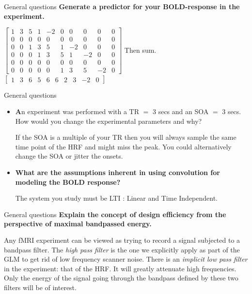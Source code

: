 \documentclass{beamer}
\begin{document}
\begin{frame}{General questions}
\textbf{Generate a predictor for your BOLD-response in the experiment.}

  \begin{center}
  $
  \left[ 
  \begin{array}{cccccccccc}
  1 & 3 & 5 & 1 & -2 & 0 & 0  & 0  & 0  & 0\\
  0 & 0 & 0 & 0 & 0  & 0 & 0  & 0  & 0  & 0\\
  0 & 0 & 1 & 3 & 5  & 1 & -2 & 0  & 0  & 0\\
  0 & 0 & 0 & 1 & 3  & 5 & 1  & -2 & 0  & 0\\
  0 & 0 & 0 & 0 & 0  & 0 & 0  & 0  & 0  & 0\\
  0 & 0 & 0 & 0 & 0  & 1 & 3  & 5  & -2 & 0
  \end{array}
  \right]
  $
\vfill
  Then sum.
\vfill  
  $
  \left[ 
  \begin{array}{cccccccccc}
  1 & 3 & 6 & 5 & 6  & 6 & 2  & 3  & -2 & 0
  \end{array}
  \right]
  $
  \end{center}
\end{frame}


\begin{frame}{General questions}
  \begin{itemize}
   \item \textbf An experiment was performed with a TR $=$ 3 secs and an SOA $=$ 3 secs. {How would you change the experimental parameters and why?}

\smallskip 
If the SOA is a multiple of your TR then you will always sample the same time point of the HRF and might miss the peak. You could alternatively change the SOA or jitter the onsets.

\bigskip
    \item \textbf{What are the assumptions inherent in using convolution for modeling the BOLD response?}

\smallskip 
The system you study must be LTI : Linear and Time Independent.
  \end{itemize}
\end{frame}


\begin{frame}{General questions}
\textbf{Explain the concept of design efficiency from the perspective of maximal bandpassed energy.}

\smallskip 
Any fMRI experiment can be viewed as trying to record a signal subjected to a bandpass filter. \linebreak
The \emph{high pass filter} is the one we explicitly apply as part of the GLM to get rid of low frequency scanner noise. \linebreak
There is an \emph{implicit low pass filter} in the experiment: that of the HRF. It will greatly attenuate high frequencies. \linebreak
Only the energy of the signal going through the bandpass defined by these two filters will be of interest.
\end{frame}
\end{document}
